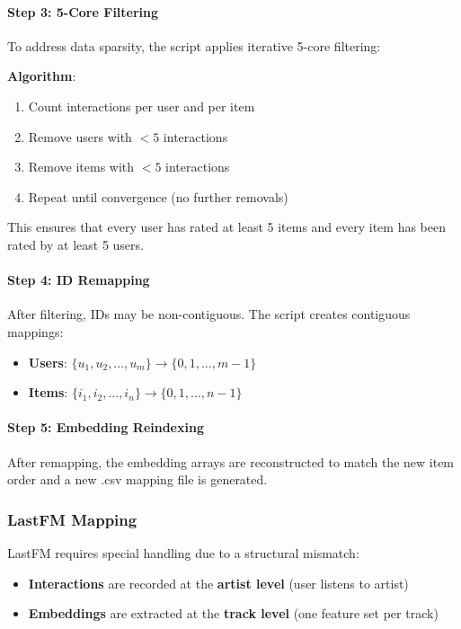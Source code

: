 \paragraph{Step 3: 5-Core Filtering}
To address data sparsity, the script applies iterative 5-core filtering:

\textbf{Algorithm}:
\begin{enumerate}
    \item Count interactions per user and per item
    \item Remove users with $< 5$ interactions
    \item Remove items with $< 5$ interactions
    \item Repeat until convergence (no further removals)
\end{enumerate}

This ensures that every user has rated at least 5 items and every item has been rated by at least 5 users.

\paragraph{Step 4: ID Remapping}
After filtering, IDs may be non-contiguous. The script creates contiguous mappings:
\begin{itemize}
    \item \textbf{Users}: $\{u_1, u_2, ..., u_m\} \rightarrow \{0, 1, ..., m-1\}$
    \item \textbf{Items}: $\{i_1, i_2, ..., i_n\} \rightarrow \{0, 1, ..., n-1\}$
\end{itemize}

\paragraph{Step 5: Embedding Reindexing}
After remapping, the embedding arrays are reconstructed to match the new item order and a new .csv mapping file is generated.


\subsubsection{LastFM Mapping}

LastFM requires special handling due to a structural mismatch:
\begin{itemize}
    \item \textbf{Interactions} are recorded at the \textbf{artist level} (user listens to artist)
    \item \textbf{Embeddings} are extracted at the \textbf{track level} (one feature set per track)
\end{itemize}

